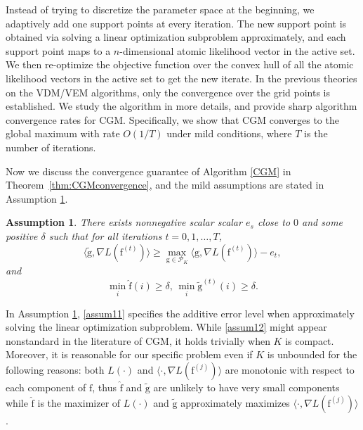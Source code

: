 \documentclass[11pt]{article}
\numberwithin{equation}{section}
\newtheorem{assumption}{Assumption}[section]
\newcommand{\PS}{\mathcal{P}}
\newcommand{\fv}{\mathrm{f}}
\newcommand{\gv}{\mathrm{g}}
\begin{document}
Instead of trying to discretize the parameter space at the beginning, we adaptively add one support points at every iteration. The new support point is obtained via solving a linear optimization subproblem approximately, and each support point maps to a $n$-dimensional atomic likelihood vector in the active set. We then re-optimize the objective function over the convex hull of all the atomic likelihood vectors in the active set to get the new iterate. In the previous theories on the VDM/VEM algorithms, only the convergence over the grid points is established. We study the algorithm in more details, and provide sharp algorithm convergence rates for CGM. Specifically, we show that CGM converges to the global maximum with rate $O(1/T)$ under mild conditions, where $T$ is the number of iterations. 

Now we discuss the convergence guarantee of Algorithm \ref{CGM} in Theorem~\ref{thm:CGMconvergence}, and the mild assumptions are stated in Assumption \ref{convergenceassumption}.

\begin{assumption}
There exists nonnegative scalar scalar $e_s$ close to $0$ and some positive $\delta$ such that for all iterations $t = 0,1,\dots,T$,
\begin{equation}
\langle \tilde{\gv}, \nabla L(\fv^{(t)})\rangle \geq \max_{{\gv} \in \PS_K} \langle {\gv}, \nabla L(\fv^{(t)}) \rangle- e_t,
\label{assum11}
\end{equation}
and
\begin{equation}
\min_i \hat{\fv}(i) \geq \delta,\, \min_i \tilde{\gv}^{(t)} (i) \geq \delta.
\label{assum12}
\end{equation}
\label{convergenceassumption}
\end{assumption}

In Assumption \ref{convergenceassumption}, \eqref{assum11} specifies the additive error level when approximately solving the linear optimization subproblem.  While \eqref{assum12} might appear nonstandard in the literature of CGM, it holds trivially when $K$ is compact. Moreover, it is reasonable for our specific problem even if $K$ is unbounded for the following reasons: both $L(\cdot)$ and $\langle \cdot, \nabla L(\fv^{(j)})\rangle $  are monotonic with respect to each component of $\fv$, thus $\hat{\fv}$ and $\tilde{\gv}$ are unlikely to have very small components while $\hat{\fv}$ is the maximizer of $L(\cdot)$ and $\tilde{\gv}$ approximately maximizes $\langle \cdot, \nabla L(\fv^{(j)})\rangle $. 
\end{document}
